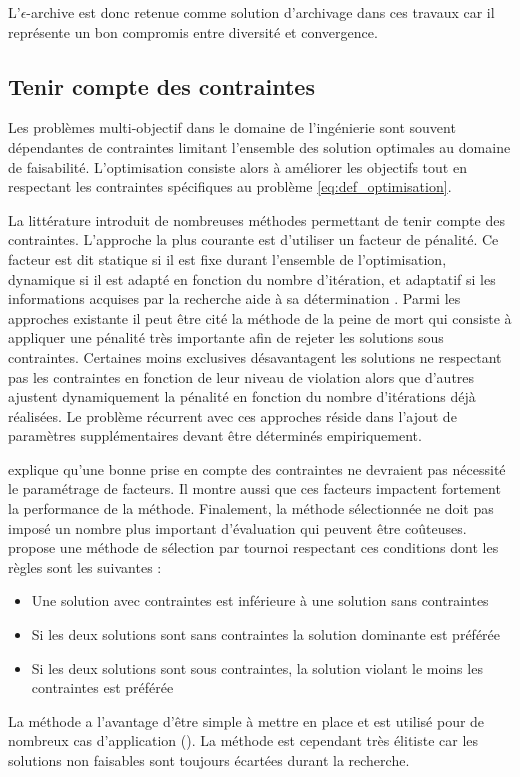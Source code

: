L’$\epsilon$-archive est donc retenue comme solution d’archivage dans ces travaux
car il représente un bon compromis entre diversité et convergence.


\subsection{Tenir compte des contraintes} %
\label{sub:tenir_compte_des_contraintes}
Les problèmes multi-objectif dans le domaine de l’ingénierie sont souvent
dépendantes de contraintes limitant l’ensemble des solution optimales au domaine
de faisabilité. L’optimisation consiste alors à améliorer les objectifs tout en
respectant les contraintes spécifiques au problème \eqref{eq:def_optimisation}.

La littérature introduit de nombreuses méthodes permettant de tenir compte des
contraintes. L’approche la plus courante est d’utiliser un facteur de pénalité.
Ce facteur est dit statique si il est fixe durant l’ensemble de l’optimisation, dynamique
si il est adapté en fonction du nombre d’itération, et adaptatif si les informations
acquises par la recherche aide à sa détermination \parencite{Coello2002}.
Parmi les approches existante il peut être cité la méthode de la peine de mort
qui consiste à appliquer une pénalité très importante afin de rejeter les solutions
sous contraintes. Certaines moins exclusives désavantagent les solutions ne respectant
pas les contraintes en fonction de leur niveau de violation alors que d’autres
ajustent dynamiquement la pénalité en fonction du nombre d’itérations déjà réalisées.
Le problème récurrent avec ces approches réside dans l’ajout de paramètres supplémentaires
devant être déterminés empiriquement.

\cite{Coello2002} explique qu’une bonne prise en compte des contraintes ne devraient
pas nécessité le paramétrage de facteurs. Il montre aussi que ces facteurs impactent
fortement la performance de la méthode. Finalement, la méthode sélectionnée ne
doit pas imposé un nombre plus important d’évaluation qui peuvent être coûteuses.
\cite{Deb2000311} propose une méthode de sélection par tournoi respectant ces conditions
dont les règles sont les suivantes :
\begin{itemize}
  \item Une solution avec contraintes est inférieure à une solution sans contraintes
  \item Si les deux solutions sont sans contraintes la solution dominante est préférée
  \item Si les deux solutions sont sous contraintes, la solution violant le moins les contraintes est préférée
\end{itemize}
La méthode a l’avantage d’être simple à mettre en place et est utilisé pour de nombreux
cas d’application (). La méthode est cependant
très élitiste car les solutions non faisables sont toujours écartées durant la
recherche.

